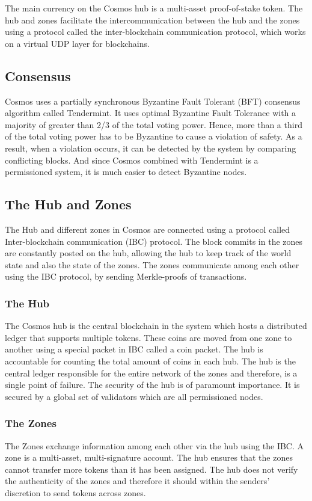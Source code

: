 \documentclass[a4paper,twoside,phd]{BYUPhys}
\begin{document}
The main currency on the Cosmos hub is a multi-asset proof-of-stake token. The hub and zones facilitate the intercommunication between the hub and the zones using a protocol called the inter-blockchain communication protocol, which works on a virtual UDP layer for blockchains.

\subsection{Consensus}
Cosmos uses a partially synchronous Byzantine Fault Tolerant (BFT) consensus algorithm called Tendermint. It uses optimal Byzantine Fault Tolerance with a majority of greater than 2/3 of the total voting power. Hence, more than a third of the total voting power has to be Byzantine to cause a violation of safety. As a result, when a violation occurs, it can be detected by the system by comparing conflicting blocks. And since Cosmos combined with Tendermint is a permissioned system, it is much easier to detect Byzantine nodes.

\subsection{The Hub and Zones}
The Hub and different zones in Cosmos are connected using a protocol called Inter-blockchain communication (IBC) protocol. The block commits in the zones are constantly posted on the hub, allowing the hub to keep track of the world state and also the state of the zones. The zones communicate among each other using the IBC protocol, by sending Merkle-proofs of transactions. 
\subsubsection{The Hub}
The Cosmos hub is the central blockchain in the system which hosts a distributed ledger that supports multiple tokens. These coins are moved from one zone to another using a special packet in IBC called a coin packet. The hub is accountable for counting the total amount of coins in each hub. The hub is the central ledger responsible for the entire network of the zones and therefore, is a single point of failure. The security of the hub is of paramount importance. It is secured by a global set of validators which are all permissioned nodes.
\subsubsection{The Zones}
The Zones exchange information among each other via the hub using the IBC. A zone is a multi-asset, multi-signature account. The hub ensures that the zones cannot transfer more tokens than it has been assigned. The hub does not verify the authenticity of the zones and therefore it should within the senders' discretion to send tokens across zones. 
\end{document}
